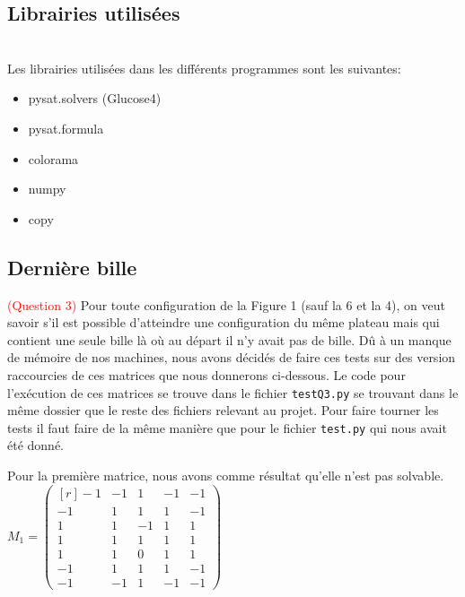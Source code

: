 \documentclass[utf8]{article}
\begin{document}
\subsection{Librairies utilisées}
\\ Les librairies utilisées dans les différents programmes sont les suivantes:
\begin{itemize}
    \item  pysat.solvers  (Glucose4)

    \item  pysat.formula

    \item colorama

    \item numpy

    \item copy
\end{itemize}


\subsection{ Dernière bille}
\textcolor{red}{(Question 3)}
Pour toute configuration de la Figure 1 (sauf la 6 et la
4), on veut savoir s’il est possible d’atteindre une configuration du même plateau
mais qui contient une seule bille là où au départ il n’y avait pas de bille. Dû à un manque de mémoire de nos machines, nous avons décidés de faire ces tests sur des version raccourcies de ces matrices que nous donnerons ci-dessous. \newline
Le code pour l'exécution de ces matrices se trouve dans le fichier \verb|testQ3.py| se trouvant dans le même dossier que le reste des fichiers relevant au projet. Pour faire tourner les tests il faut faire de la même manière que pour le fichier \verb|test.py| qui nous avait été donné.

\newline

Pour la première matrice, nous avons comme résultat qu'elle n'est pas solvable.\vspace{0.25cm} \newline
\hspace{5cm}
$M_1 = \begin{pmatrix*}[r]
-1 & -1 &  1 & -1 & -1\\
-1 &  1 &  1 &  1 & -1\\
 1 &  1 & -1 &  1 &  1\\
 1 &  1 &  1 &  1 &  1\\
 1 &  1 &  0 &  1 &  1\\
-1 &  1 &  1 &  1 & -1\\
-1 & -1 &  1 & -1 & -1
\end{pmatrix*}$
\newline
\end{document}
